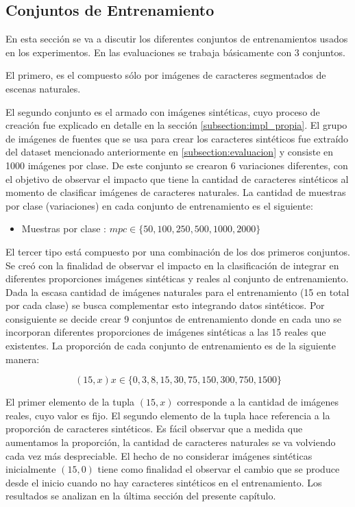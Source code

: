 \subsection{Conjuntos de Entrenamiento}

	En esta sección se va a discutir los diferentes conjuntos de entrenamientos usados en los experimentos. En las evaluaciones se trabaja básicamente con 3 conjuntos.
	
	El primero, es el compuesto sólo por imágenes de caracteres segmentados de escenas naturales.
	
	El segundo conjunto es el armado con imágenes sintéticas, cuyo proceso de creación fue explicado en detalle en la sección \ref{subsection:impl_propia}. El grupo de imágenes de fuentes que se usa para crear los caracteres sintéticos fue extraído del dataset mencionado anteriormente en \ref{subsection:evaluacion} y consiste en 1000 imágenes por clase. De este conjunto se crearon 6 variaciones diferentes, con el objetivo de observar el impacto que tiene la cantidad de caracteres sintéticos al momento de clasificar imágenes de caracteres naturales. La cantidad de muestras por clase (variaciones) en cada conjunto de entrenamiento es el siguiente:
	\begin{itemize}
		\item Muestras por clase : $ mpc \in \{ 50,100,250,500,1000,2000\}$
	\end{itemize}

	El tercer tipo está compuesto por una combinación de los dos primeros conjuntos. Se creó con la finalidad de observar el impacto en la clasificación de integrar en diferentes proporciones imágenes sintéticas y reales al conjunto de entrenamiento. Dada la escasa cantidad de imágenes naturales para el entrenamiento (15 en total por cada clase) se busca complementar esto integrando datos sintéticos. Por consiguiente se decide crear 9 conjuntos de entrenamiento donde en cada uno se incorporan diferentes proporciones de imágenes sintéticas a las 15 reales que existentes. La proporción de cada conjunto de entrenamiento es de la siguiente manera: 
	
	$$(15, x) x \in \{0,3,8,15,30,75,150,300,750,1500 \}$$
	
	El primer elemento de la tupla $(15, x)$ corresponde a la cantidad de imágenes reales, cuyo valor es fijo. El segundo elemento de la tupla hace referencia a la proporción de caracteres sintéticos. Es fácil observar que a medida que aumentamos la proporción, la cantidad de caracteres naturales se va volviendo cada vez más despreciable. El hecho de no considerar imágenes sintéticas inicialmente $(15,0)$ tiene como finalidad el observar el cambio que se produce desde el inicio cuando no hay caracteres sintéticos en el entrenamiento. Los resultados se analizan en la última sección del presente capítulo.
	
